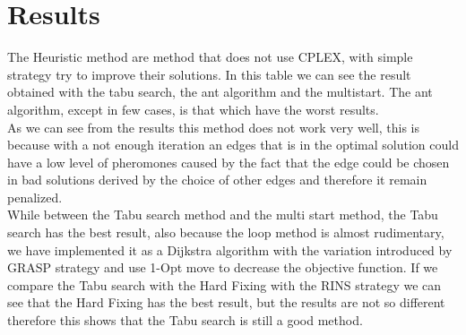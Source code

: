 \section{Results}
The Heuristic method are method that does not use \textsc{CPLEX}, with simple strategy try to improve their solutions. In this table we can see the result obtained with the tabu search, the ant algorithm and the multistart. The ant algorithm, except in few cases, is that which have the worst results.\\
As we can see from the results this method does not work very well, this is because with a not enough iteration an edges that is in the optimal solution could have a low level of pheromones caused by the fact that the edge could be chosen in bad solutions derived by the choice of other edges and therefore it remain penalized.\\
While between the Tabu search method and the multi start method, the Tabu search has the best result, also because the loop method is almost rudimentary, we have implemented it as a Dijkstra algorithm with the variation introduced by GRASP strategy and use 1-Opt move to decrease the objective function. If we compare the Tabu search with the Hard Fixing with the RINS strategy we can see that the Hard Fixing has the best result, but the results are not so different therefore this shows that the Tabu search is still a good method.\\

